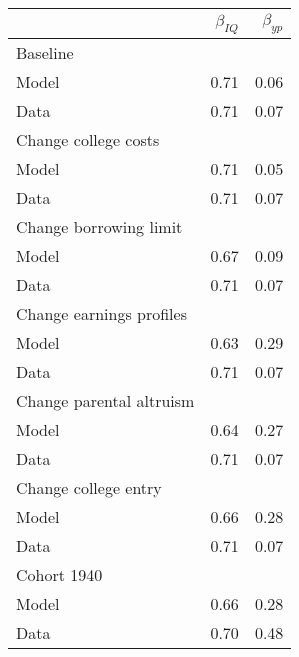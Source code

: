 \begin{tabular}{lrr}
\hline
  & $\beta_{IQ}$  & $\beta_{yp}$  \\ 
\hline
Baseline &   &   \\ 
Model & 0.71  & 0.06  \\ 
Data & 0.71  & 0.07  \\ 
Change college costs &   &   \\ 
Model & 0.71  & 0.05  \\ 
Data & 0.71  & 0.07  \\ 
Change borrowing limit &   &   \\ 
Model & 0.67  & 0.09  \\ 
Data & 0.71  & 0.07  \\ 
Change earnings profiles &   &   \\ 
Model & 0.63  & 0.29  \\ 
Data & 0.71  & 0.07  \\ 
Change parental altruism &   &   \\ 
Model & 0.64  & 0.27  \\ 
Data & 0.71  & 0.07  \\ 
Change college entry &   &   \\ 
Model & 0.66  & 0.28  \\ 
Data & 0.71  & 0.07  \\ 
Cohort 1940 &   &   \\ 
Model & 0.66  & 0.28  \\ 
Data & 0.70  & 0.48  \\ 
\hline
\end{tabular}%
